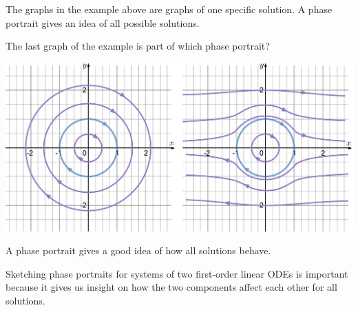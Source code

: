 The graphs in the example above are graphs of one specific solution. A phase portrait gives an idea of all possible solutions. 
\begin{example}
The last graph of the example is part of which phase portrait?

\begin{center}
\includegraphics*[width=420pt]{images/module18-possiblephaseportraits.pdf}
\end{center}

A phase portrait gives a good idea of how all solutions behave.
\end{example}

Sketching phase portraits for systems of two first-order linear ODEs is important because it gives us insight on how the two components affect each other for all solutions.


